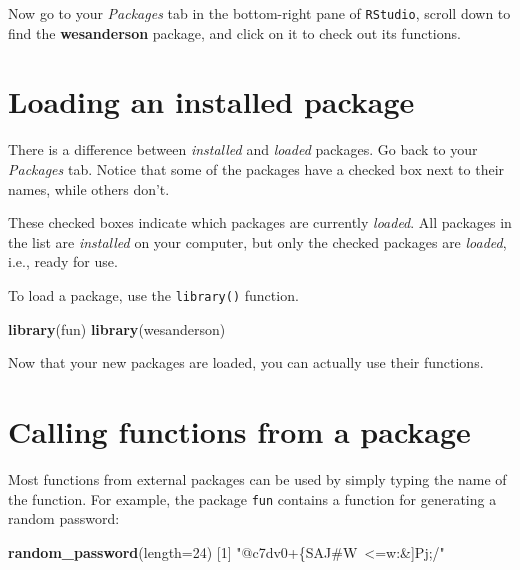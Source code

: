 \documentclass[
]{book}
\newenvironment{Shaded}{\begin{snugshade}}{\end{snugshade}}
\newcommand{\DataTypeTok}[1]{\textcolor[rgb]{0.13,0.29,0.53}{#1}}
\newcommand{\DecValTok}[1]{\textcolor[rgb]{0.00,0.00,0.81}{#1}}
\newcommand{\KeywordTok}[1]{\textcolor[rgb]{0.13,0.29,0.53}{\textbf{#1}}}
\newcommand{\NormalTok}[1]{#1}
\newcommand{\StringTok}[1]{\textcolor[rgb]{0.31,0.60,0.02}{#1}}
\begin{document}
Now go to your \emph{Packages} tab in the bottom-right pane of \texttt{RStudio}, scroll down to find the \textbf{wesanderson} package, and click on it to check out its functions.

\hypertarget{loading-an-installed-package}{%
\section*{Loading an installed package}\label{loading-an-installed-package}}

There is a difference between \emph{installed} and \emph{loaded} packages. Go back to your \emph{Packages} tab. Notice that some of the packages have a checked box next to their names, while others don't.

These checked boxes indicate which packages are currently \emph{loaded}. All packages in the list are \emph{installed} on your computer, but only the checked packages are \emph{loaded}, i.e., ready for use.

To load a package, use the \texttt{library()} function.

\begin{Shaded}
\begin{Highlighting}[]
\KeywordTok{library}\NormalTok{(fun)}
\KeywordTok{library}\NormalTok{(wesanderson)}
\end{Highlighting}
\end{Shaded}

Now that your new packages are loaded, you can actually use their functions.

\hypertarget{calling-functions-from-a-package}{%
\section*{Calling functions from a package}\label{calling-functions-from-a-package}}

Most functions from external packages can be used by simply typing the name of the function. For example, the package \texttt{fun} contains a function for generating a random password:

\begin{Shaded}
\begin{Highlighting}[]
\KeywordTok{random_password}\NormalTok{(}\DataTypeTok{length=}\DecValTok{24}\NormalTok{)}
\NormalTok{[}\DecValTok{1}\NormalTok{] }\StringTok{"@c7dv0+\{SAJ#W~<=w:&]Pj;/"}
\end{Highlighting}
\end{Shaded}
\end{document}
